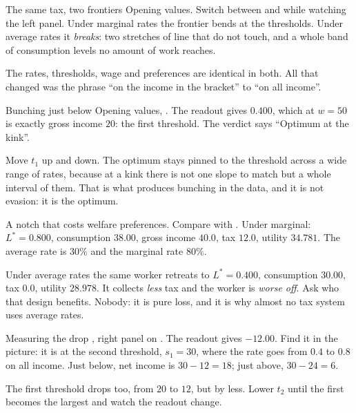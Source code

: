 \documentclass[11pt,a4paper]{appletmanual}
\begin{document}
\begin{activity}{The same tax, two frontiers}
\amset Opening values. Switch between  and  while watching the left panel.
\amexp Under marginal rates the frontier bends at the thresholds. Under average
rates it \emph{breaks}: two stretches of line that do not touch, and a whole
band of consumption levels no amount of work reaches.
\par\smallskip
The rates, thresholds, wage and preferences are identical in both. All that
changed was the phrase ``on the income in the bracket'' to ``on all income''.
\end{activity}

\begin{activity}{Bunching just below}
\amset Opening values, .
\amexp The  readout gives $0.400$, which at $w = 50$ is exactly
gross income $20$: the first threshold. The verdict says ``Optimum at the
kink''.
\par\smallskip
Move $t_1$ up and down. The optimum stays pinned to the threshold across a wide
range of rates, because at a kink there is not one slope to match but a whole
interval of them. That is what produces bunching in the data, and it is not
evasion: it is the optimum.
\end{activity}

\begin{activity}{A notch that costs welfare}
\amset {} preferences. Compare  with
.
\amexp Under marginal: $L^\ast = 0.800$, consumption $38.00$, gross income
$40.0$, tax $12.0$, utility $34.781$. The average rate is $30\%$ and the
marginal rate $80\%$.
\par\smallskip
Under average rates the same worker retreats to $L^\ast = 0.400$, consumption
$30.00$, tax $0.0$, utility $28.978$. It collects \emph{less} tax and the
worker is \emph{worse off}. Ask who that design benefits. Nobody: it is pure
loss, and it is why almost no tax system uses average rates.
\end{activity}

\begin{activity}{Measuring the drop}
\amset {}, right panel on .
\amexp The  readout gives $-12.00$. Find it in the picture:
it is at the second threshold, $s_1 = 30$, where the rate goes from $0.4$ to
$0.8$ on all income. Just below, net income is $30 - 12 = 18$; just above,
$30 - 24 = 6$.
\par\smallskip
The first threshold drops too, from $20$ to $12$, but by less. Lower $t_2$
until the first becomes the largest and watch the readout change.
\end{activity}
\end{document}

